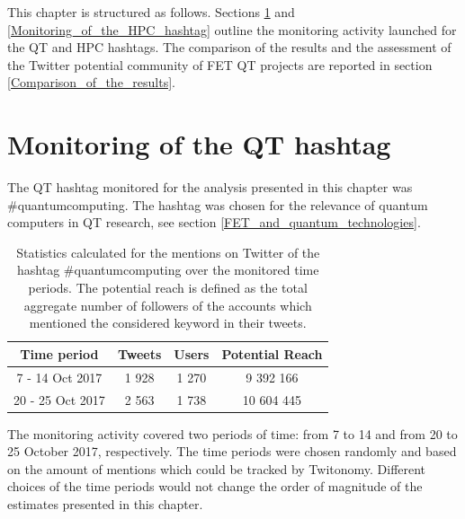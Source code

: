 This chapter is structured as follows. Sections \ref{Monitoring_of_the_QT_hashtag} and \ref{Monitoring_of_the_HPC_hashtag} outline the monitoring activity launched for the QT and HPC hashtags. The comparison of the results and the assessment of the Twitter potential community of FET QT projects are reported in section \ref{Comparison_of_the_results}. 

\section{Monitoring of the QT hashtag} \label{Monitoring_of_the_QT_hashtag}
The QT hashtag monitored for the analysis presented in this chapter was \#quantumcomputing. The hashtag was chosen for the relevance of quantum computers in QT research, see section \ref{FET_and_quantum_technologies}. 

\begin{table}[t]
 \begin{center}
  \begin{tabular}{cccc}
   \hline 
   \hline
   Time period & Tweets & Users & Potential Reach \\ 
   \hline
   \hline
   7 - 14 Oct 2017 & 1 928 & 1 270 & 9 392 166  \\
   20 - 25 Oct 2017 & 2 563 & 1 738 & 10 604 445  \\
   \hline
   \hline
  \end{tabular}
 \end{center} 
 \caption{Statistics calculated for the mentions on Twitter of the hashtag \#quantumcomputing over the monitored time periods. The potential reach is defined as the total aggregate number of followers of the accounts which mentioned the considered keyword in their tweets.}
\label{Summary_QuantumComputing} 
\end{table}

The monitoring activity covered two periods of time: from 7 to 14 and from 20 to 25 October 2017, respectively. The time periods were chosen randomly and based on the amount of mentions which could be tracked by Twitonomy. Different choices of the time periods would not change the order of magnitude of the estimates presented in this chapter.

